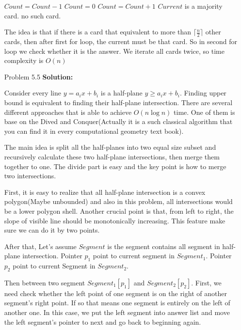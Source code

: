 \normalfont\documentclass[letterpaper,11pt]{article}
\begin{document}
\begin{enumerate}
\begin{algorithmic}
					\Else
						\State $Count = Count - 1$
					\EndIf
				\EndIf
			\EndFor
			\State $Count = 0$
					\State $Count = Count + 1$	
				\EndIf			
			\EndFor
				\State \Return $Current$ is a majority card.
			\Else
				\State \Return no such card.
			\EndIf
		\EndFunction
	\end{algorithmic}
	The idea is that if there is a card that equivalent to more than $\lceil \frac{n}{2} \rceil$ other cards, then after first for loop, the current must be that card. So in second for loop we check whether it is the answer. We iterate all cards twice, so time complexity is $O(n)$
\item [Problem 5.5]\textbf{Solution:}\par
	Consider every line $y = a_i x + b_i$ is a half-plane $y \ge a_i x + b_i$. Finding upper bound is equivalent to finding their half-plane intersection. There are several different approaches that is able to achieve $O(n\log n)$ time. One of them is base on the Dived and Conquer(Actually it is a such classical algorithm that you can find it in every computational geometry text book).\par
	The main idea is split all the half-planes into two equal size subset and recursively calculate these two half-plane intersections, then merge them together to one. The divide part is easy and the key point is how to merge two intersections. \par
	First, it is easy to realize that all half-plane intersection is a convex polygon(Maybe unbounded) and also in this problem, all intersections would be a lower polygon shell. Another crucial point is that, from left to right, the slope of visible line should be monotonically increasing. This feature make sure we can do it by two points.\par
	After that, Let's assume $Segment$ is the segment contains all segment in half-plane intersection. Pointer $p_1$ point to current segment in $Segment_1$. Pointer $p_2$ point to current Segment in $Segment_2$. \par
	Then between two segment $Segment_1[p_1]$ and $Segment_2[p_2]$. First, we need check whether the left point of one segment is on the right of another segment's right point. If so that means one segment is entirely on the left of another one. In this case, we put the left segment into answer list and move the left segment's pointer to next and go back to beginning again.\par

\end{enumerate}
\end{document}
